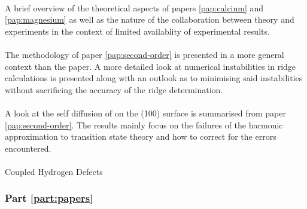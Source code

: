 \paragraph{}
A brief overview of the theoretical aspects of papers \ref{pap:calcium} and \ref{pap:magnesium} as well as the nature of the collaboration between theory and experiments in the context of limited availablity of experimental results.

\paragraph{}
The methodology of paper \ref{pap:second-order} is presented in a more general context than the paper.
A more detailed look at numerical instabilities in ridge calculations is presented along with an outlook as to minimising said instabilities without sacrificing the accuracy of the ridge determination.

\paragraph{}
A look at the self diffusion of  on the (100) surface is summarised from paper \ref{pap:second-order}.
The results mainly focus on the failures of the harmonic approximation to transition state theory and how to correct for the errors encountered.

\paragraph{}
Coupled Hydrogen Defects \expand

\subsubsection{Part \ref{part:papers}}
\placeholder
